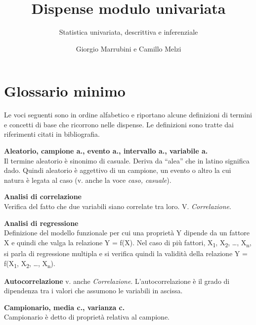 \documentclass[
  11pt,
]{book}
\title{Dispense modulo univariata}
\subtitle{Statistica univariata, descrittiva e inferenziale}
\author{Giorgio Marrubini e Camillo Melzi}
\date{}
\begin{document}
\maketitle

{
\hypersetup{linkcolor=}
\setcounter{tocdepth}{1}
\tableofcontents
}
\hypertarget{section}{%
\chapter*{}\label{section}}

\hypertarget{glossario}{%
\chapter*{Glossario minimo}\label{glossario}}

Le voci seguenti sono in ordine alfabetico e riportano alcune definizioni di termini e concetti di base che ricorrono nelle dispense.
Le definizioni sono tratte dai riferimenti citati in bibliografia.
\citep{legarzantine2014, everittb.s.skrondala.2010, wonnacottt.h.wonnacottr.j.2002}

\textbf{Aleatorio, campione a., evento a., intervallo a., variabile a.}\\
Il termine aleatorio è sinonimo di casuale.
Deriva da ``alea'' che in latino significa dado.
Quindi aleatorio è aggettivo di un campione, un evento o altro la cui natura è legata al caso (v. anche la voce \emph{caso, casuale}).

\textbf{Analisi di correlazione}\\
Verifica del fatto che due variabili siano correlate tra loro.
V. \emph{Correlazione}.

\textbf{Analisi di regressione}\\
Definizione del modello funzionale per cui una proprietà Y dipende da un fattore X e quindi che valga la relazione Y = f(X).
Nel caso di più fattori, X\textsubscript{1}, X\textsubscript{2}, \ldots, X\textsubscript{n}, si parla di regressione multipla e si verifica quindi la validità della relazione Y = f(X\textsubscript{1}, X\textsubscript{2}, \ldots, X\textsubscript{n}).

\textbf{Autocorrelazione} v. anche \emph{Correlazione}.
L'autocorrelazione è il grado di dipendenza tra i valori che assumono le variabili in ascissa.

\textbf{Campionario, media c., varianza c.}\\
Campionario è detto di proprietà relativa al campione.
\end{document}
